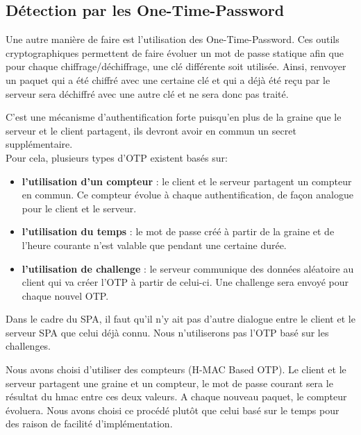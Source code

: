 \subsection{Détection par les \textbf{O}ne-\textbf{T}ime-\textbf{P}assword}

Une autre manière de faire est l'utilisation des One-Time-Password. Ces outils cryptographiques permettent de faire évoluer un mot de passe statique afin que pour chaque chiffrage/déchiffrage, une clé différente soit utilisée. Ainsi, renvoyer un paquet qui a été chiffré avec une certaine clé et qui a déjà été reçu par le serveur sera déchiffré avec une autre clé et ne sera donc pas traité.

C'est une mécanisme d'authentification forte puisqu'en plus de la graine que le serveur et le client partagent, ils devront avoir en commun un secret supplémentaire.\\

Pour cela, plusieurs types d'OTP existent basés sur:

\begin{itemize}

\item \textbf{l'utilisation d'un compteur} : le client et le serveur partagent un compteur en commun. Ce compteur évolue à chaque authentification, de façon analogue pour le client et le serveur.

\item \textbf{l'utilisation du temps} : le mot de passe créé à partir de la graine et de l'heure courante n'est valable que pendant une certaine durée.

\item \textbf{l'utilisation de challenge} : le serveur communique des données aléatoire au client qui va créer l'OTP à partir de celui-ci. Une challenge sera envoyé pour chaque nouvel OTP.

\end{itemize}

\vspace{0.5cm}

Dans le cadre du SPA, il faut qu'il n'y ait pas d'autre dialogue entre le client et le serveur SPA que celui déjà connu. Nous n'utiliserons pas l'OTP basé sur les challenges.

Nous avons choisi d'utiliser des compteurs (H-MAC Based OTP). Le client et le serveur partagent une graine et un compteur, le mot de passe courant sera le résultat du hmac entre ces deux valeurs. A chaque nouveau paquet, le compteur évoluera. Nous avons choisi ce procédé plutôt que celui basé sur le temps pour des raison de facilité d'implémentation.

